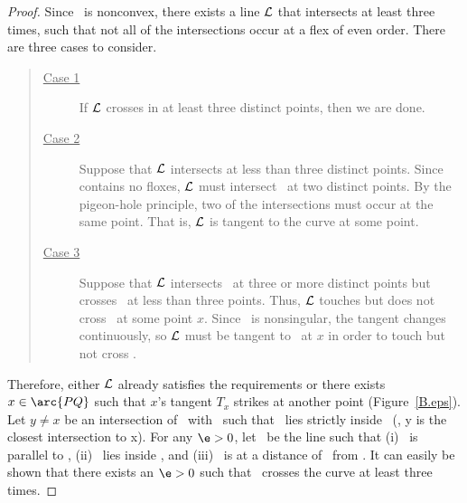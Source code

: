 \begin{proof}
Since \pq\ is nonconvex, there exists a line ${\cal L}$ that
intersects  at least three times, such that not all
of the intersections occur at a flex of even order.
There are three cases to consider.
%
\begin{quote}
\begin{description}
\item[\underline{Case 1}] If ${\cal L}$ crosses  in at least three
distinct points, then we are done.
\item[\underline{Case 2}] Suppose that ${\cal L}$ intersects  at less
than three distinct points.  
Since  contains no floxes, ${\cal L}$ must intersect \pq\ at two
distinct points.
By the pigeon-hole principle, two of the intersections must occur at the
same point. 
That is, ${\cal L}$ is tangent to the curve at some point.
\item[\underline{Case 3}]
Suppose that ${\cal L}$ intersects \pq\ at three or more
distinct points but crosses \pq\ at less than three points.
Thus, ${\cal L}$ touches but does not cross \pq\ at some point $x$.
Since \pq\ is nonsingular, the tangent changes continuously, so ${\cal L}$
must be tangent to \pq\ at $x$ in order to touch but not cross \pq.
\end{description}
\end{quote}
%
Therefore, either ${\cal L}$ already satisfies the requirements or
there exists $x \in \arc{PQ}$ such that $x$'s
tangent $T_{x}$ strikes  at another point (Figure~\ref{B.eps}).
Let $y \neq x$ be an intersection of \tx\ with \pq\ such that 
\xya\ lies strictly
inside \tx\ (\ie, y is the closest intersection to x).
For any $\e > 0$, let \lep\ be the line such that (i) \lep\ 
is parallel to \tx,
(ii) \lep\ lies inside \tx, and (iii) \lep\ is at a distance of \e\ from \tx.
It can easily be shown that there exists an $\e > 0$ such that 
\lep\ crosses the curve at least three times.

\end{proof}

